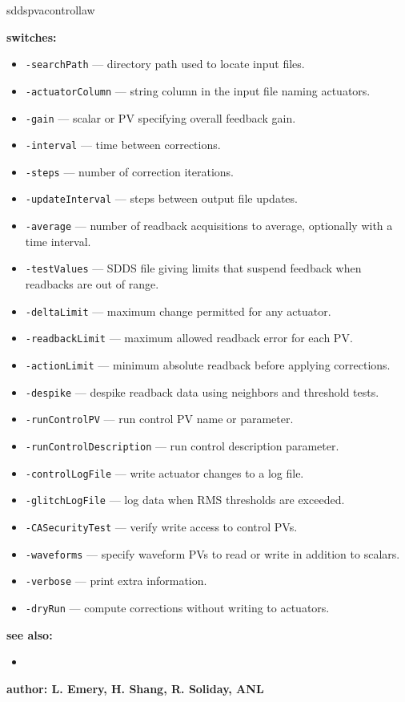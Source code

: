 \begin{sddsprog}{sddspvacontrollaw}
\item {\bf switches:}
  \begin{itemize}
  \item {\tt -searchPath} --- directory path used to locate input files.
  \item {\tt -actuatorColumn} --- string column in the input file naming actuators.
  \item {\tt -gain} --- scalar or PV specifying overall feedback gain.
  \item {\tt -interval} --- time between corrections.
  \item {\tt -steps} --- number of correction iterations.
  \item {\tt -updateInterval} --- steps between output file updates.
  \item {\tt -average} --- number of readback acquisitions to average, optionally with a time interval.
  \item {\tt -testValues} --- SDDS file giving limits that suspend feedback when readbacks are out of range.
  \item {\tt -deltaLimit} --- maximum change permitted for any actuator.
  \item {\tt -readbackLimit} --- maximum allowed readback error for each PV.
  \item {\tt -actionLimit} --- minimum absolute readback before applying corrections.
  \item {\tt -despike} --- despike readback data using neighbors and threshold tests.
  \item {\tt -runControlPV} --- run control PV name or parameter.
  \item {\tt -runControlDescription} --- run control description parameter.
  \item {\tt -controlLogFile} --- write actuator changes to a log file.
  \item {\tt -glitchLogFile} --- log data when RMS thresholds are exceeded.
  \item {\tt -CASecurityTest} --- verify write access to control PVs.
  \item {\tt -waveforms} --- specify waveform PVs to read or write in addition to scalars.
  \item {\tt -verbose} --- print extra information.
  \item {\tt -dryRun} --- compute corrections without writing to actuators.
  \end{itemize}

\item {\bf see also:}
  \begin{itemize}
  \item {}
  \end{itemize}

\item {\bf author: L. Emery, H. Shang, R. Soliday, ANL}
\end{sddsprog}
